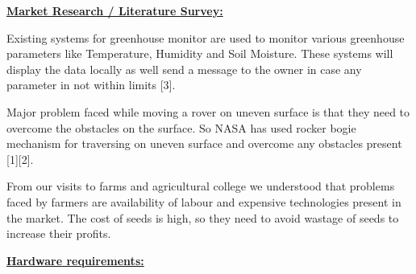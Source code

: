 \documentclass[12pt]{article}
\begin{document}
\begin{adjustwidth}{0.5in}{0.52in}
{\fontsize{14pt}{16.8pt}\selectfont \textbf{\uline{Market Research / Literature Survey:}}\par}\par

\end{adjustwidth}

\begin{adjustwidth}{0.5in}{0.52in}
\begin{justify}
Existing systems for greenhouse monitor are used to monitor various greenhouse parameters like Temperature, Humidity and Soil Moisture. These systems will display the data locally as well send a message to the owner in case any parameter in not within limits [3].
\end{justify}\par

\end{adjustwidth}

\begin{adjustwidth}{0.5in}{0.52in}
\begin{justify}
Major problem faced while moving a rover on uneven surface is that they need to overcome the obstacles on the surface. So NASA has used rocker bogie mechanism for traversing on uneven surface and overcome any obstacles present [1][2].
\end{justify}\par

\end{adjustwidth}

\begin{adjustwidth}{0.5in}{0.52in}
\begin{justify}
From our visits to farms and agricultural college we understood that problems faced by farmers are availability of labour and expensive technologies present in the market. The cost of seeds is high, so they need to avoid wastage of seeds to increase their profits.
\end{justify}\par

\end{adjustwidth}

\begin{adjustwidth}{0.5in}{0.52in}
{\fontsize{14pt}{16.8pt}\selectfont \textbf{\uline{Hardware requirements:}}\par}\par

\end{adjustwidth}
\end{document}
